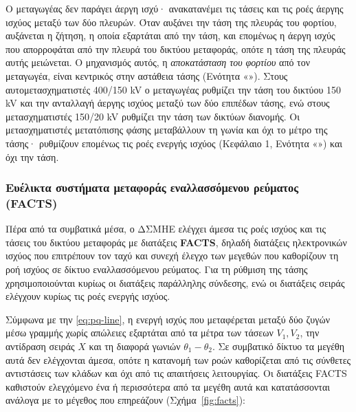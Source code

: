 Ο μεταγωγέας δεν παράγει άεργη ισχύ· ανακατανέμει τις τάσεις και τις ροές άεργης ισχύος
μεταξύ των δύο πλευρών. Όταν αυξάνει την τάση της πλευράς του φορτίου, αυξάνεται η ζήτηση, η
οποία εξαρτάται από την τάση, και επομένως η άεργη ισχύς που απορροφάται από την πλευρά του
δικτύου μεταφοράς, οπότε η τάση της πλευράς αυτής μειώνεται. Ο μηχανισμός αυτός, η
\emph{αποκατάσταση του φορτίου} από τον μεταγωγέα, είναι κεντρικός στην αστάθεια τάσης
(Ενότητα «»). Στους αυτομετασχηματιστές 400/150 kV ο μεταγωγέας
ρυθμίζει την τάση του δικτύου 150 kV και την ανταλλαγή άεργης ισχύος μεταξύ των δύο επιπέδων
τάσης, ενώ στους μετασχηματιστές 150/20 kV ρυθμίζει την τάση των δικτύων διανομής. Οι
μετασχηματιστές μετατόπισης φάσης μεταβάλλουν τη γωνία και όχι το μέτρο της τάσης· ρυθμίζουν
επομένως τις ροές ενεργής ισχύος (Κεφάλαιο 1, Ενότητα «») και όχι την τάση.

\subsubsection{Ευέλικτα συστήματα μεταφοράς εναλλασσόμενου ρεύματος (FACTS)}
\label{sec:facts}

Πέρα από τα συμβατικά μέσα, ο ΔΣΜΗΕ ελέγχει άμεσα τις ροές ισχύος και τις τάσεις του δικτύου
μεταφοράς με διατάξεις \textbf{FACTS}, δηλαδή διατάξεις ηλεκτρονικών ισχύος που επιτρέπουν τον
ταχύ και συνεχή έλεγχο των μεγεθών που καθορίζουν τη ροή ισχύος σε δίκτυο εναλλασσόμενου
ρεύματος. Για τη ρύθμιση της τάσης χρησιμοποιούνται κυρίως οι διατάξεις παράλληλης σύνδεσης,
ενώ οι διατάξεις σειράς ελέγχουν κυρίως τις ροές ενεργής ισχύος.

Σύμφωνα με την \eqref{eq:pq-line}, η ενεργή ισχύς που μεταφέρεται μεταξύ δύο ζυγών μέσω
γραμμής χωρίς απώλειες εξαρτάται από τα μέτρα των τάσεων $V_1, V_2$, την αντίδραση σειράς
$X$ και τη διαφορά γωνιών $\theta_1 - \theta_2$. Σε
συμβατικό δίκτυο τα μεγέθη αυτά δεν ελέγχονται άμεσα, οπότε η κατανομή των ροών καθορίζεται
από τις σύνθετες αντιστάσεις των κλάδων και όχι από τις απαιτήσεις λειτουργίας. Οι διατάξεις
FACTS καθιστούν ελεγχόμενο ένα ή περισσότερα από τα μεγέθη αυτά και κατατάσσονται ανάλογα με
το μέγεθος που επηρεάζουν (Σχήμα~\ref{fig:facts}):

